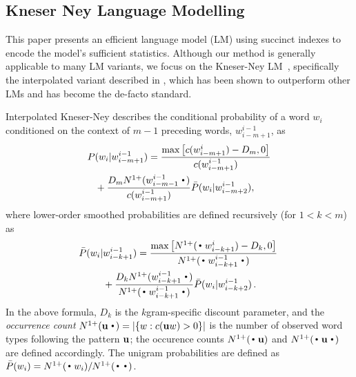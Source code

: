 
\subsection{Kneser Ney Language Modelling}
\label{sec-lm}


This paper presents an efficient \ngram language model (LM) using succinct indexes to encode the model's sufficient statistics. %
Although our method is generally applicable to many LM variants, 
we focus on the Kneser-Ney LM~\cite{kneser1995improved}, 
specifically the interpolated variant described in , 
which has been shown to outperform other \ngram LMs and has become the de-facto standard.

Interpolated Kneser-Ney describes the conditional probability of a word $w_i$ conditioned on the context of $m-1$ preceding words, $w_{i-m+1}^{i-1}$, as 
\begin{align}
P(w_i |& w_{i-m+1}^{i-1})=\frac{\max\left[c(w^{i}_{i-m+1}) - D_m,0\right]}{c(w^{i-1}_{i-m+1})} \nonumber \\
& \hspace{-6mm} +\frac{D_m \nlplus{w^{i-1}_{i-m-1}\Bigcdot} }{c(w^{i-1}_{i-m+1})}  
\bar{P}(w_i | w_{i-m+2}^{i-1}) ,  
\label{eq:high}
\end{align}
where lower-order smoothed probabilities are defined recursively (for $1<k<m$) as 
\begin{align}
\! \bar{P}(w_i |& w_{i-k+1}^{i-1})
 = \frac{\max\left[\nlplus{\Bigcdot w_{i-k+1}^{i}} - D_k,0\right]}{\nlplus{\Bigcdot w_{i-k+1}^{i-1} \Bigcdot}} \nonumber \\
&+ \frac{D_k \nlplus{w_{i-k+1}^{i-1}\Bigcdot}}{\nlplus{\Bigcdot w_{i-k+1}^{i-1} \Bigcdot}} \bar{P}(w_i | w_{i-k+2}^{i-1}) \,  . \! \label{eq:mid}
\end{align}
In the above formula, $D_k$ is the $k$gram-specific discount parameter, and 
the \emph{occurrence count} 
\mbox{$\nlplus{\uu\Bigcdot} = |\{w: c(\uu w)>0\}|$} 
is the number of observed word types following the pattern ${\mathbf{u}}$; 
the occurence counts $\nlplus{\Bigcdot\uu}$ and $\nlplus{\Bigcdot\uu\Bigcdot}$ 
are defined accordingly.
The unigram probabilities are defined as
%
$ \bar{P}(w_i) = \nlplus{\Bigcdot w_i} / \nlplus{\Bigcdot\Bigcdot}$.

